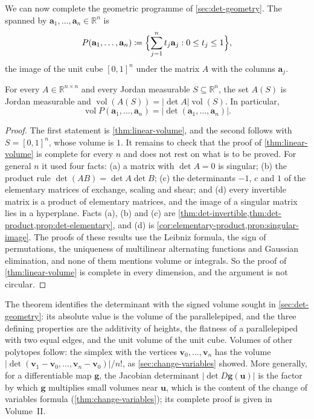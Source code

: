 We can now complete the geometric programme of \cref{sec:det-geometry}. The  spanned by $\mathbf a_1,\ldots,\mathbf a_n\in\mathbb R^n$ is
\[
P(\mathbf a_1,\ldots,\mathbf a_n)\coloneqq\Bigl\{\sum_{j=1}^nt_j\mathbf a_j: 0\le t_j\le1\Bigr\},
\]
the image of the unit cube $[0,1]^n$ under the matrix $A$ with the columns $\mathbf a_j$.

\begin{theorem}
\label{thm:det-volume}
For every $A\in\mathbb R^{n\times n}$ and every Jordan measurable $S\subseteq\mathbb R^n$, the set $A(S)$ is Jordan measurable and $\operatorname{vol}(A(S))=|\det A|\operatorname{vol}(S)$. In particular,
\[
\operatorname{vol}P(\mathbf a_1,\ldots,\mathbf a_n)=|\det(\mathbf a_1,\ldots,\mathbf a_n)| .
\]
\end{theorem}

\begin{proof}
The first statement is \cref{thm:linear-volume}, and the second follows with $S=[0,1]^n$, whose volume is $1$. It remains to check that the proof of \cref{thm:linear-volume} is complete for every $n$ and does not rest on what is to be proved. For general $n$ it used four facts: (a) a matrix with $\det A=0$ is singular; (b) the product rule $\det(AB)=\det A\det B$; (c) the determinants $-1$, $c$ and $1$ of the elementary matrices of exchange, scaling and shear; and (d) every invertible matrix is a product of elementary matrices, and the image of a singular matrix lies in a hyperplane. Facts (a), (b) and (c) are \cref{thm:det-invertible,thm:det-product,prop:det-elementary}, and (d) is \cref{cor:elementary-product,prop:singular-image}. The proofs of these results use the Leibniz formula, the sign of permutations, the uniqueness of multilinear alternating functions and Gaussian elimination, and none of them mentions volume or integrals. So the proof of \cref{thm:linear-volume} is complete in every dimension, and the argument is not circular.
\end{proof}

The theorem identifies the determinant with the signed volume sought in \cref{sec:det-geometry}: its absolute value is the volume of the parallelepiped, and the three defining properties are the additivity of heights, the flatness of a parallelepiped with two equal edges, and the unit volume of the unit cube. Volumes of other polytopes follow: the simplex with the vertices $\mathbf v_0,\ldots,\mathbf v_n$ has the volume $|\det(\mathbf v_1-\mathbf v_0,\ldots,\mathbf v_n-\mathbf v_0)|/n!$, as \cref{sec:change-variables} showed. More generally, for a differentiable map $\mathbf g$, the Jacobian determinant $|\det D\mathbf g(\mathbf u)|$ is the factor by which $\mathbf g$ multiplies small volumes near $\mathbf u$, which is the content of the change of variables formula (\cref{thm:change-variables}); its complete proof is given in Volume~II.

